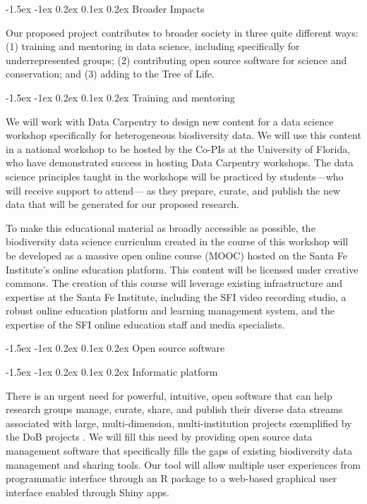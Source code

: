 \documentclass[11pt]{article}
\makeatletter
\renewcommand\section{\@startsection{section}{1}{\z@}%
                                  {-1.5ex \@plus -1ex \@minus 0.2ex}%
                                  {0.1ex \@plus 0.2ex}%
                                  {\normalfont\Large\bfseries}}
\renewcommand\subsection{\@startsection{subsection}{1}{\z@}%
                                  {-1.5ex \@plus -1ex \@minus 0.2ex}%
                                  {0.1ex \@plus 0.2ex}%
                                  {\normalfont\large\bfseries}}
\renewcommand\subsubsection{\@startsection{subsection}{1}{\z@}%
                                  {-1.5ex \@plus -1ex \@minus 0.2ex}%
                                  {0.1ex \@plus 0.2ex}%
                                  {\normalfont\bfseries}}
\makeatother
\begin{document}
\section{Broader Impacts}\label{broader-impacts}

Our proposed project contributes to broader society in three quite
different ways: (1) training and mentoring in data science, including
specifically for underrepresented groups; (2) contributing open source
software for science and conservation; and (3) adding to the Tree of
Life.

\subsection{Training and mentoring}\label{training-and-mentoring}

We will work with Data Carpentry to design new content for a data
science workshop specifically for heterogeneous biodiversity data. We
will use this content in a national workshop to be hosted by the Co-PIs
at the University of Florida, who have demonstrated success in hosting
Data Carpentry workshops. The data science principles taught in the
workshops will be practiced by students---who will receive support to
attend--- as they prepare, curate, and publish the new data that will be
generated for our proposed research.

To make this educational material as broadly accessible as possible, the
biodiversity data science curriculum created in the course of this
workshop will be developed as a massive open online course (MOOC) hosted
on the Santa Fe Institute's online education platform. This content will
be licensed under creative commons. The creation of this course will
leverage existing infrastructure and expertise at the Santa Fe
Institute, including the SFI video recording studio, a robust online
education platform and learning management system, and the expertise of
the SFI online education staff and media specialists.

\subsection{Open source software}\label{open-source-software}

\subsubsection{Informatic platform}\label{informatic-platform}

There is an urgent need for powerful, intuitive, open software that can
help research groups manage, curate, share, and publish their diverse
data streams associated with large, multi-dimension, multi-institution
projects exemplified by the DoB projects . We will fill this need by
providing open source data management software that specifically fills
the gaps of existing biodiversity data management and sharing tools. Our
tool will allow multiple user experiences from programmatic interface
through an R package to a web-based graphical user interface enabled
through Shiny apps.
\end{document}
